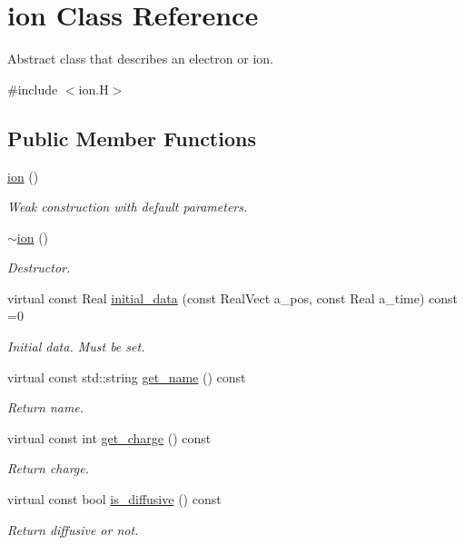 \hypertarget{classion}{}\section{ion Class Reference}
\label{classion}


Abstract class that describes an electron or ion.  




{\ttfamily \#include $<$ion.\+H$>$}

\subsection*{Public Member Functions}
\begin{DoxyCompactItemize}
\item 
\hyperlink{classion_a6c62c25fa4268e0db86a8925f5d2884e}{ion} ()
\begin{DoxyCompactList}\small\item\em Weak construction with default parameters. \end{DoxyCompactList}\item 
\hyperlink{classion_a170608b858a949f9c31273d95a2dce30}{$\sim$ion} ()
\begin{DoxyCompactList}\small\item\em Destructor. \end{DoxyCompactList}\item 
virtual const Real \hyperlink{classion_a8184bc1cec016e19bb68eff30cd987fc}{initial\+\_\+data} (const Real\+Vect a\+\_\+pos, const Real a\+\_\+time) const =0
\begin{DoxyCompactList}\small\item\em Initial data. Must be set. \end{DoxyCompactList}\item 
virtual const std\+::string \hyperlink{classion_a4e50942aafc71ee65ceb809c78e899d7}{get\+\_\+name} () const 
\begin{DoxyCompactList}\small\item\em Return name. \end{DoxyCompactList}\item 
virtual const int \hyperlink{classion_adefb6df3bda4405d398c079f1450d00d}{get\+\_\+charge} () const 
\begin{DoxyCompactList}\small\item\em Return charge. \end{DoxyCompactList}\item 
virtual const bool \hyperlink{classion_a92d25bdc15addbec8cb6e5d5d99676bf}{is\+\_\+diffusive} () const 
\begin{DoxyCompactList}\small\item\em Return diffusive or not. \end{DoxyCompactList}\end{DoxyCompactItemize}
